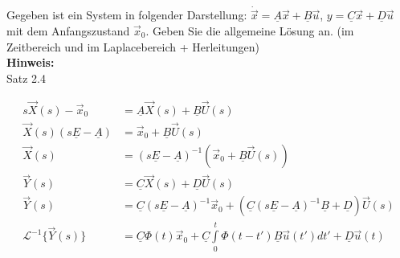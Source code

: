 \begin{question}[section=3,name={Anfangszustand},difficulty=5,type=mdl,tags={}]
	Gegeben ist ein System in folgender Darstellung: $\dot{\vec x} = \underline A\vec x + \underline B\vec u$, $y = \underline C\vec x + \underline D\vec u$ mit dem Anfangszustand $\vec x_0$. Geben Sie die allgemeine Lösung an. (im Zeitbereich und im Laplacebereich + Herleitungen)
	\\ \textbf{Hinweis:}\\
	Satz 2.4
\end{question}
\begin{solution}
	\begin{align}
		s \vec X(s) -\vec x_0 & = \underline A \vec X(s) + \underline B \vec U(s)\\
		\vec X(s) (s \underline E - \underline A) &= \vec x_0 + \underline B \vec U(s)\\
		\vec X(s) &= (s \underline E - \underline A)^{-1}(\vec x_0 + \underline B \vec U(s))\\
		\vec Y(s) &= \underline C \vec X(s) + \underline D \vec U(s)\\
		\vec Y(s) &= \underline C (s \underline E - \underline A)^{-1}\vec x_0 + (\underline C(s \underline E - \underline A)^{-1}\underline B +\underline D) \vec U(s)\\
		\mathscr L ^{-1}\{ \vec Y(s) \}&= \underline C \Phi(t)\vec x_0 + \underline C \int \limits _0 ^t\Phi(t-t')\underline B \vec u(t') dt' +\underline D \vec u(t)
	\end{align}
\end{solution}
